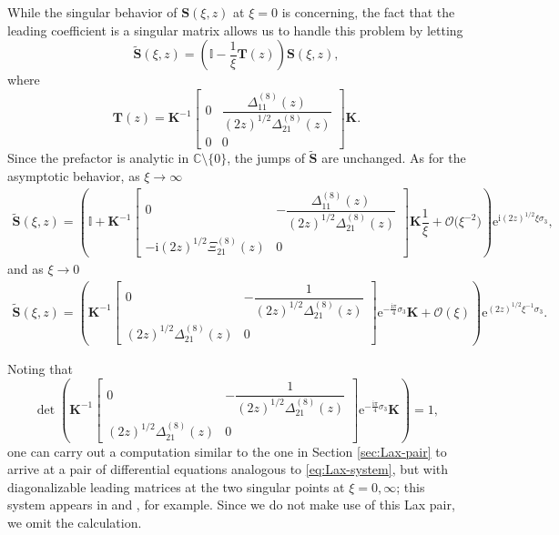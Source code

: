 \documentclass[pdftex]{sigma}
\numberwithin{equation}{section}
\newcommand{\ee}{\mathrm{e}}
\newcommand{\ii}{\mathrm{i}}
\newcommand{\C}{{\mathbb{C}}}
\begin{document}
While the singular behavior of $\mathbf{S}(\xi, z)$ at $\xi = 0$ is concerning, the fact that the leading coefficient is a singular matrix allows us to handle this problem by letting
\begin{equation}\label{eq:triangular-transformation}
\widetilde{\mathbf{S}}(\xi, z) = \left( \mathbb{I} -\dfrac{1}{\xi} \mathbf{T}(z) \right) \mathbf{S}(\xi, z),
\end{equation}
where
\begin{equation}
\mathbf{T}(z) = \mathbf{K}^{-1}\begin{bmatrix} 0 & \dfrac{\Delta^{(8)}_{11}(z)}{(2z)^{1/2}\Delta^{(8)}_{21}(z)} \\ 0 & 0\end{bmatrix}\mathbf{K}.
\label{eq:L-def}
\end{equation}
Since the prefactor is analytic in $\C \setminus \{0\}$, the jumps of $\widetilde{\mathbf{S}}$ are unchanged. As for the asymptotic behavior, as $\xi\to\infty$
\begin{align*}
\widetilde{\mathbf S}(\xi, z) = \left( \mathbb{I} + \mathbf K^{-1} \begin{bmatrix}
 0 & -\dfrac{\Delta^{(8)}_{11}(z)}{(2z)^{1/2}\Delta^{(8)}_{21}(z)} \\ -\ii(2z)^{1/2} \Xi^{(8)}_{21}(z) & 0
\end{bmatrix} \mathbf K \dfrac{1}{\xi}+ \mathcal{O}\big(\xi^{-2}\big) \right)\ee^{\ii (2z)^{1/2} \xi \sigma_3},
\end{align*}
and as $\xi\to 0$
\begin{align*}
\widetilde{\mathbf S}(\xi, z) = \left( \mathbf{K}^{-1}\begin{bmatrix} 0 & -\dfrac{1}{(2z)^{1/2}\Delta^{(8)}_{21}(z)} \\ (2z)^{1/2}\Delta^{(8)}_{21}(z) & 0\end{bmatrix} \ee^{-\frac{\ii\pi}{4}\sigma_3}\mathbf{K} + \mathcal{O}(\xi) \right)\ee^{{ (2z)^{1/2}}{ \xi^{-1}} \sigma_3}.
\end{align*}
\begin{Remark}
Noting that
\[
\det \left( \mathbf{K}^{-1}\begin{bmatrix} 0 & -\dfrac{1}{(2z)^{1/2}\Delta^{(8)}_{21}(z)} \\ (2z)^{1/2}\Delta^{(8)}_{21}(z) & 0\end{bmatrix} \ee^{-\frac{\ii\pi}{4}\sigma_3}\mathbf{K} \right) = 1,
\]
one can carry out a computation similar to the one in Section \ref{sec:Lax-pair} to arrive at a pair of differential equations analogous to \eqref{eq:Lax-system}, but with diagonalizable leading matrices at the two singular points at $\xi = 0, \infty$; this system appears in \cite[Chapter 2]{N} and \cite{GL}, for example. Since we do not make use of this Lax pair, we omit the calculation.
\end{Remark}
\end{document}
